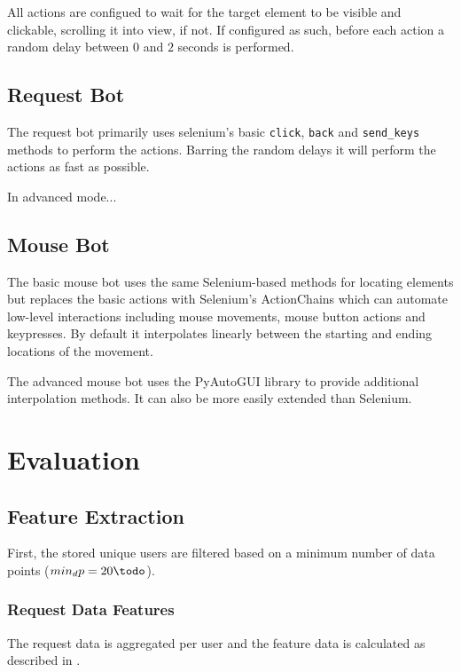 \documentclass[
    fontsize=12pt,
    headings=small,
    parskip=half,           %
    bibliography=totoc,
    numbers=noenddot,       %
    open=any,               %
    final                   %
    ]{scrreprt}
\begin{document}
All actions are configued to wait for the target element to be visible and clickable, scrolling it into view, if not. If configured as such, before each action a random delay between $0$ and $2$ seconds is performed.

\section{Request Bot}

The request bot primarily uses selenium's basic \lstinline{click}, \lstinline{back} and \lstinline{send_keys} methods to perform the actions. Barring the random delays it will perform the actions as fast as possible.

In advanced mode... \todo

\section{Mouse Bot}

The basic mouse bot uses the same Selenium-based methods for locating elements but replaces the basic actions with Selenium's ActionChains which can automate low-level interactions including mouse movements, mouse button actions and keypresses. By default it interpolates linearly between the starting and ending locations of the movement.

The advanced mouse bot uses the PyAutoGUI library to provide additional interpolation methods. It can also be more easily extended than Selenium.

\chapter{Evaluation}

\section{Feature Extraction}

First, the stored unique users are filtered based on a minimum number of data points ($min_dp = 20\todo$).

\subsection{Request Data Features}

The request data is aggregated per user  and the feature data is calculated as described in .
\end{document}
